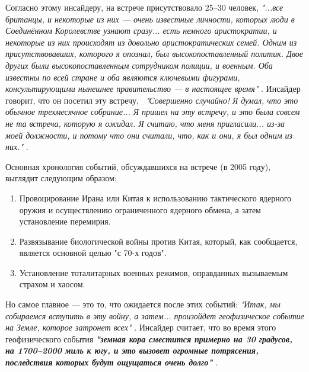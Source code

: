 \documentclass[10pt,twocolumn,letterpaper]{article}
\begin{document}
Согласно этому инсайдеру, на встрече присутствовало 25–30 человек, \textit{"...все британцы, и некоторые из них — очень известные личности, которых люди в Соединённом Королевстве узнают сразу... есть немного аристократии, и некоторые из них происходят из довольно аристократических семей. Одним из присутствовавших, которого я опознал, был высокопоставленный политик. Двое других были высокопоставленным сотрудником полиции, и военным. Оба известны по всей стране и оба являются ключевыми фигурами, консультирующими нынешнее правительство — в настоящее время"} \cite{4}. Инсайдер говорит, что он посетил эту встречу, \ \textit{"Совершенно случайно! Я думал, что это обычное трехмесячное собрание... Я пришел на эту встречу, и это была совсем не та встреча, которую я ожидал. Я считаю, что меня пригласили... из-за моей должности, и потому что они считали, что, как и они, я был одним из них."} \cite{4}.

Основная хронология событий, обсуждавшихся на встрече (в 2005 году), выглядит следующим образом:
\begin{flushleft}
\begin{enumerate}
    \item Провоцирование Ирана или Китая к использованию тактического ядерного оружия и осуществлению ограниченного ядерного обмена, а затем установление перемирия.
    \item Развязывание биологической войны против Китая, который, как сообщается, является основной целью "с 70-х годов".
    \item Установление тоталитарных военных режимов, оправданных вызываемым страхом и хаосом.
\end{enumerate}
\end{flushleft}

Но самое главное — это то, что ожидается после этих событий: \textit{"Итак, мы собираемся вступить в эту войну, а затем... произойдет геофизическое событие на Земле, которое затронет всех"} \cite{4}. Инсайдер считает, что во время этого геофизического события \textit{\textbf{"земная кора сместится примерно на 30 градусов, на 1700–2000 миль к югу, и это вызовет огромные потрясения, последствия которых будут ощущаться очень долго"}} \cite{4}.
\end{document}
